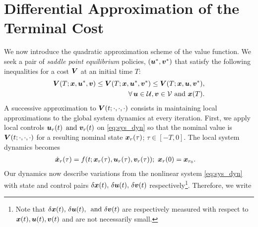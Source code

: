\section{Differential Approximation of the Terminal Cost}
\label{sec:methods}
%
We now introduce the quadratic approximation scheme of the value function.
 We seek a pair of \emph{saddle point equilibrium} policies, $(\bm{u}^*, \bm{v}^*)$ that satisfy the following inequalities for a cost $\bm{V}$ at an initial time $T$:
\begin{align}
	\begin{split}
		\bm{V}(T; \bm{x}, \bm{u}^*, \bm{v}) \leq \bm{V}(T; \bm{x}, \bm{u}^*, \bm{v}^*) \leq
		\bm{V}(T; \bm{x}, \bm{u}, \bm{v}^*),  \\ 
		\forall \, \bm{u} \in \mathcal{U}, \bm{v} \in \mathcal{V} \text{  and } \bm{x}(T).
	\end{split}
\end{align}
%
A successive approximation to $\bm{V}(t; \cdot, \cdot, \cdot)$ consists in  maintaining local approximations to the global system dynamics at every iteration. %
%
%
First, we apply local controls $\bm{u}_r(t) \, \text{ and } \bm{v}_r(t)$ on \eqref{eq:sys_dyn} so that the nominal value  is $\bm{V}(t; \cdot, \cdot, \cdot)$ for a resulting nominal state $\bm{x}_r(\tau)$; $\tau \in \left[-T, 0\right]$. The local system dynamics becomes
%
\begin{align}
	\dot{\bm{x}}_r(\tau) &= f(t; \bm{x}_r(\tau), \bm{u}_r(\tau), \bm{v}_r(\tau)); \,\, \bm{x}_r(0) = \bm{x}_{r_0}.
\end{align}
%
Our dynamics now describe variations from the nonlinear system \cf \eqref{eq:sys_dyn} with state and control pairs $\delta \bm{x}(t), \, \delta \bm{u}(t), \,\delta \bm{v}(t)$ respectively\footnote{Note that $\delta \bm{x}(t), \, \delta \bm{u}(t), \,\text{ and } \delta \bm{v}(t)$ are respectively measured with respect to $\bm{x}(t), \bm{u}(t), \bm{v}(t)$ and are not necessarily small.}. Therefore, we write
